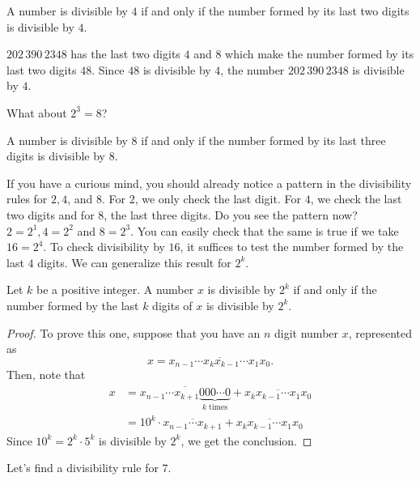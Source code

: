 \begin{proposition}[Divisibility by $4$]
A number is divisible by $4$ if and only if the number formed by its last two digits is divisible by $4$.
\end{proposition}

\begin{example}
$202\, 390\, 2348$ has the last two digits $4$ and $8$ which make the number formed by its last two digits $48$. Since $48$ is divisible by $4$, the number $202\, 390\, 2348$ is divisible by $4$.
\end{example}

What about $2^3=8$?

\begin{proposition}[Divisibility by $8$]
A number is divisible by $8$ if and only if the number formed by its last three digits is divisible by $8$.
\end{proposition}

If you have a curious mind, you should already notice a pattern in the divisibility rules for $2,4$, and $8$. For $2$, we only check the last digit. For $4$, we check the last two digits and for $8$, the last three digits. Do you see the pattern now? $2=2^1,4=2^2$ and $8=2^3$. You can easily check that the same is true if we take $16=2^4$. To check divisibility by $16$, it suffices to test the number formed by the last $4$ digits. We can generalize this result for $2^k$.

\begin{theorem}[Divisibility by $2^k$]
Let $k$ be a positive integer. A number $x$ is divisible by $2^k$ if and only if the number formed by the last $k$ digits of $x$ is divisible by $2^k$.
\end{theorem}

\begin{proof}
To prove this one, suppose that you have an $n$ digit number $x$, represented as $$x = \overline{x_{n-1} \cdots x_k x_{k-1} \cdots x_1 x_0 }.$$ Then, note that
\begin{align*}
	x &= \overline{x_{n-1} \cdots x_{k+1} \underbrace{000\cdots 0}_{k \text{ times}}} + \overline{x_k x_{k-1} \cdots x_1 x_0} \\
	&= 10^k \cdot \overline{x_{n-1} \cdots x_{k+1}} +  \overline{x_k x_{k-1} \cdots x_1 x_0}
\end{align*}
Since $10^k=2^k \cdot 5^k$ is divisible by $2^k$, we get the conclusion.
\end{proof}

Let's find a divisibility rule for $7$.


